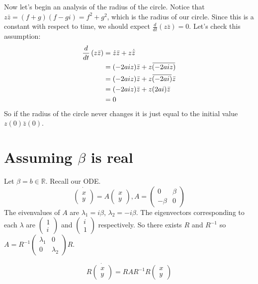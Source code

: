 \documentclass[10pt]{article}
\newcommand{\overbar}[1]{\mkern 1.5mu\overline{\mkern-1.5mu#1\mkern-1.5mu}\mkern 1.5mu}
\begin{document}
Now let's begin an analysis of the radius of the circle.
Notice that $z\bar z=(f+g)(f-gi)=f^2+g^2$, which is the radius of our circle. 
Since this is a constant with respect to time, we should expect $\frac{d}{dt}\left(z\bar z\right)=0$.
Let's check this assumption:
\begin{align*}
\frac{d}{dt}\left(z\bar z\right)&=\dot z\bar z+z\dot {\bar z}\\
&=(-2aiz)\bar z+z\overbar{(-2aiz)}\\
&=(-2aiz)\bar z+z\overbar{(-2ai)}\bar z\\
&=(-2aiz)\bar z+z(2ai)\bar z\\
&=0
\end{align*}
So if the radius of the circle never changes it is just equal to the initial value $z(0)\bar z(0)$.

\section{Assuming $\beta$ is real}

Let $\beta=b\in\mathbb R$.
Recall our ODE.
$$\dot{\begin{pmatrix}x\\y\end{pmatrix}}=A{\begin{pmatrix}x\\y\end{pmatrix}}, A=\begin{pmatrix}0&\beta\\-\beta&0\end{pmatrix}$$
The eivenvalues of $A$ are $\lambda_1=i\beta$, $\lambda_2=-i\beta$.
The eigenvectors corresponding to each $\lambda$ are $\begin{pmatrix}1\\i\end{pmatrix}$ and $\begin{pmatrix}i\\1\end{pmatrix}$ respectively. So there exists $R$ and $R^{-1}$ so $A=R^{-1}\begin{pmatrix}\lambda_1&0\\0&\lambda_2\end{pmatrix}R$.

$$R\dot{\begin{pmatrix}x\\y\end{pmatrix}}=RAR^{-1}R{\begin{pmatrix}x\\y\end{pmatrix}}$$
\end{document}
